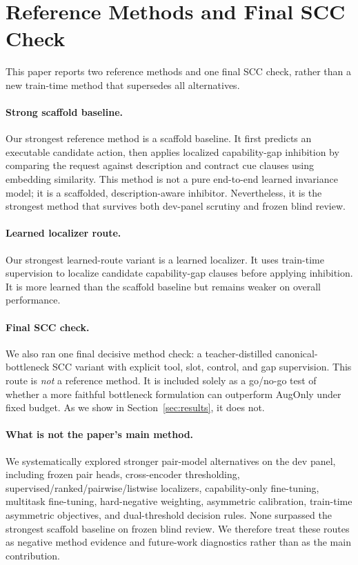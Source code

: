 \section{Reference Methods and Final SCC Check}
\label{sec:methods}

This paper reports two reference methods and one final SCC check, rather than a new train-time method that supersedes all alternatives.

\paragraph{Strong scaffold baseline.}
Our strongest reference method is a scaffold baseline. It first predicts an executable candidate action, then applies localized capability-gap inhibition by comparing the request against description and contract cue clauses using embedding similarity. This method is not a pure end-to-end learned invariance model; it is a scaffolded, description-aware inhibitor. Nevertheless, it is the strongest method that survives both dev-panel scrutiny and frozen blind review.

\paragraph{Learned localizer route.}
Our strongest learned-route variant is a learned localizer. It uses train-time supervision to localize candidate capability-gap clauses before applying inhibition. It is more learned than the scaffold baseline but remains weaker on overall performance.

\paragraph{Final SCC check.}
We also ran one final decisive method check: a teacher-distilled canonical-bottleneck SCC variant with explicit tool, slot, control, and gap supervision. This route is \emph{not} a reference method. It is included solely as a go/no-go test of whether a more faithful bottleneck formulation can outperform AugOnly under fixed budget. As we show in Section~\ref{sec:results}, it does not.

\paragraph{What is not the paper's main method.}
We systematically explored stronger pair-model alternatives on the dev panel, including frozen pair heads, cross-encoder thresholding, supervised/ranked/pairwise/listwise localizers, capability-only fine-tuning, multitask fine-tuning, hard-negative weighting, asymmetric calibration, train-time asymmetric objectives, and dual-threshold decision rules. None surpassed the strongest scaffold baseline on frozen blind review. We therefore treat these routes as negative method evidence and future-work diagnostics rather than as the main contribution.
